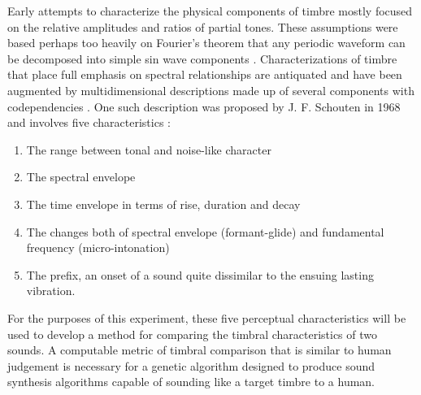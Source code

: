 \documentclass[12pt]{article}
\begin{document}
Early attempts to characterize the physical components of timbre mostly focused on the relative amplitudes and ratios of partial tones. These assumptions were based perhaps too heavily on Fourier's theorem that any periodic waveform can be decomposed into simple sin wave components \citep{helmholtz1857physiological, helmholtz1954sensations}. Characterizations of timbre that place full emphasis on spectral relationships are antiquated and have been augmented by multidimensional descriptions made up of several components with codependencies \citep{erickson1975sound}. One such description was proposed by J. F. Schouten in 1968 and involves five characteristics \citep{schouten1968perception, erickson1975sound}:
\begin{enumerate}
\item
The range between tonal and noise-like character
\item
The spectral envelope
\item
The time envelope in terms of rise, duration and decay
\item
The changes both of spectral envelope (formant-glide) and fundamental frequency (micro-intonation)
\item
The prefix, an onset of a sound quite dissimilar to the ensuing lasting vibration.
\end{enumerate}

For the purposes of this experiment, these five perceptual characteristics will be used to develop a method for comparing the timbral characteristics of two sounds. A computable metric of timbral comparison that is similar to human judgement is necessary for a genetic algorithm designed to produce sound synthesis algorithms capable of sounding like a target timbre to a human.
\end{document}
